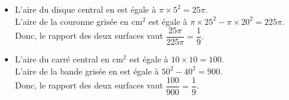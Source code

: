 \begin{itemize}
   \item L'aire du disque central en \ucmq{} est égale à $\pi\times5^2 =25\pi$. \\
   L'aire de la couronne grisée en cm$^2$ est égale à $\pi\times25^2 -\pi\times20^2=225\pi$. \\ [1mm]
   Donc, le rapport des deux surfaces vaut $\dfrac{25\pi}{225\pi} =  \dfrac19.$
   \bigskip
   \item L'aire du carré central en cm$^2$ est égale à $10\times10 =100$. \\
   L'aire de la bande grisée en \ucmq{} est égale à $50^2-40^2 =900$. \\ [1mm]
   Donc, le rapport des deux surfaces vaut $\dfrac{100}{900} =\dfrac19$.
\end{itemize}
